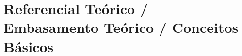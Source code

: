 
\chapter{Referencial Teórico / Embasamento Teórico / Conceitos Básicos}
\label{chap:referencial-teorico}

